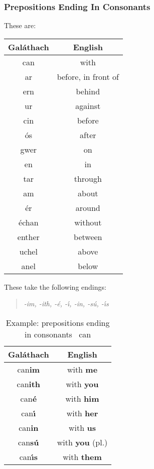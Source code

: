 \subsubsection{Prepositions Ending In Consonants}
These are:
\begin{table}[H]
\centering
\begin{tabular}{c|c}
  \textbf{Gal\'{a}thach} & \textbf{English}\\
  \toprule
  can & with\\
  ar & before, in front of\\
  ern & behind\\
  ur & against\\
  cin & before\\
  \'{o}s & after\\
  gwer & on\\
  en & in\\
  tar & through\\
  am & about\\
  \'{e}r & around\\
  \'{e}chan & without\\
  enther & between\\
  uchel & above\\
  anel & below
\end{tabular}
\label{summary_prepositions_ending_in_consonants}
\end{table}

These take the following endings:
\begin{quote}
\textit{-im, -ith, -\'{e}, -\'{\i}, -in, -s\'{u}, -\'{\i}s}
\end{quote}

\begin{table}[H]
\centering
\begin{tabular}{c|c}
  \textbf{Gal\'{a}thach} & \textbf{English}\\
  \toprule
  can\textbf{im} & with \textbf{me}\\
  can\textbf{ith} & with \textbf{you}\\
  can\textbf{\'{e}} & with \textbf{him}\\
  can\textbf{\'{\i}} & with \textbf{her}\\
  can\textbf{in} & with \textbf{us}\\
  can\textbf{s\'{u}} & with \textbf{you} (pl.)\\
  can\textbf{\'{\i}s} & with \textbf{them}
\end{tabular}
\caption{Example: prepositions ending in consonants \textendash\ can}
\label{example_prepositions_ending_in_consonants_can}
\end{table}

